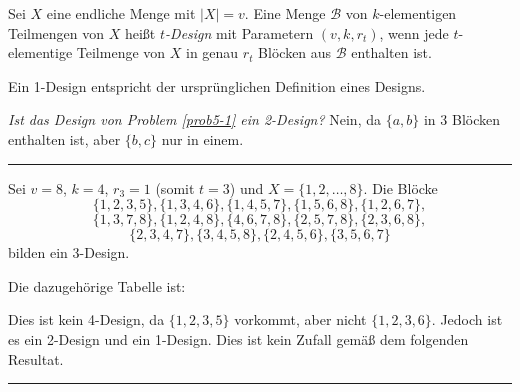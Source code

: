 \documentclass[9pt]{article}
\begin{document}
\begin{defi} \label{defi5-6}
Sei $X$ eine endliche Menge mit $|X| = v$. Eine Menge $\mathcal{B}$ von $k$-elementigen Teilmengen von $X$ heißt \textit{$t$-Design} mit Parametern $(v, k, r_t)$, wenn jede $t$-elementige Teilmenge von $X$ in genau $r_t$ Blöcken aus $\mathcal{B}$ enthalten ist.  

\noindent Ein 1-Design entspricht der ursprünglichen Definition eines Designs.  

\noindent \textit{Ist das Design von Problem \ref{prob5-1} ein 2-Design?}  
Nein, da $\{a, b\}$ in 3 Blöcken enthalten ist, aber $\{b, c\}$ nur in einem.
\end{defi} \noindent \rule{8cm}{0.4pt}

\begin{bsp}
Sei $v = 8$, $k = 4$, $r_3 = 1$ (somit $t = 3$) und $X = \{1, 2, \dots, 8\}$.  
Die Blöcke
\[
\{1, 2, 3, 5\}, \{1, 3, 4, 6\}, \{1, 4, 5, 7\}, \{1, 5, 6, 8\}, \{1, 2, 6, 7\}, 
\]
\[
\{1, 3, 7, 8\}, \{1, 2, 4, 8\}, \{4, 6, 7, 8\}, \{2, 5, 7, 8\}, \{2, 3, 6, 8\}, 
\]
\[
\{2, 3, 4, 7\}, \{3, 4, 5, 8\}, \{2, 4, 5, 6\}, \{3, 5, 6, 7\}
\]
bilden ein 3-Design.  

Die dazugehörige Tabelle ist:
\begin{table}[H]
\centering
{}
\caption{Beispieltabelle}
\end{table}
\noindent Dies ist kein 4-Design, da $\{1, 2, 3, 5\}$ vorkommt, aber nicht $\{1, 2, 3, 6\}$.  
Jedoch ist es ein 2-Design und ein 1-Design. Dies ist kein Zufall gemäß dem folgenden Resultat.  
\end{bsp} \noindent \rule{8cm}{0.4pt}
\end{document}
